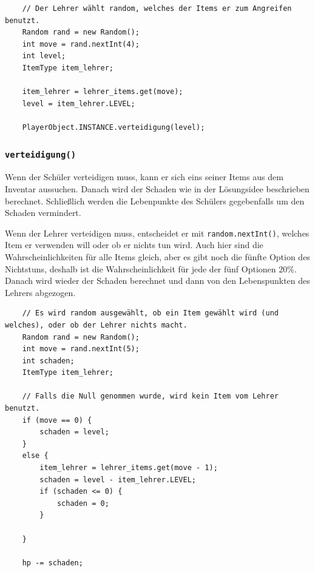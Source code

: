 \begin{lstlisting}
	// Der Lehrer wählt random, welches der Items er zum Angreifen benutzt. 
	Random rand = new Random();
	int move = rand.nextInt(4);
	int level;
	ItemType item_lehrer;
	
	item_lehrer = lehrer_items.get(move);
	level = item_lehrer.LEVEL;
	
	PlayerObject.INSTANCE.verteidigung(level);
\end{lstlisting}

\subsubsection{\texttt{verteidigung()}}

Wenn der Schüler verteidigen muss, kann er sich eins seiner Items aus dem Inventar aussuchen. Danach wird der Schaden wie in der Lösungsidee beschrieben berechnet. Schließlich werden die Lebenpunkte des Schülers gegebenfalls um den Schaden vermindert.\par
Wenn der Lehrer verteidigen muss, entscheidet er mit \texttt{random.nextInt()}, welches Item er verwenden will oder ob er nichts tun wird. Auch hier sind die Wahrscheinlichkeiten für alle Items gleich, aber es gibt noch die fünfte Option des Nichtstuns, deshalb ist die Wahrscheinlichkeit für jede der fünf Optionen 20\%. Danach wird wieder der Schaden berechnet und dann von den Lebenspunkten des Lehrers abgezogen. 
\begin{lstlisting}
	// Es wird random ausgewählt, ob ein Item gewählt wird (und welches), oder ob der Lehrer nichts macht.
	Random rand = new Random();
	int move = rand.nextInt(5);
	int schaden;
	ItemType item_lehrer;
	
	// Falls die Null genommen wurde, wird kein Item vom Lehrer benutzt.
	if (move == 0) {
		schaden = level;
	}
	else {
		item_lehrer = lehrer_items.get(move - 1);
		schaden = level - item_lehrer.LEVEL;
		if (schaden <= 0) {
			schaden = 0;
		}
		
	}
	
	hp -= schaden;
\end{lstlisting}
